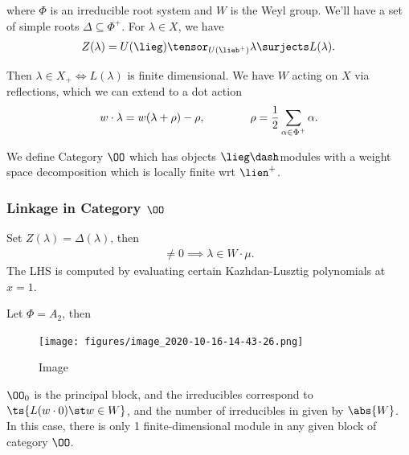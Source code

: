 where \(\Phi\) is an irreducible root system and \(W\) is the Weyl
group. We'll have a set of simple roots \(\Delta\subseteq \Phi^+\). For
\(\lambda\in X\), we have
\begin{align*}  
Z(\lambda) = U(\lieg) \tensor_{U(\lieb^+)} \lambda \surjects L(\lambda)
.\end{align*}

Then \(\lambda \in X_+ \iff L(\lambda)\) is finite dimensional. We have
\(W\) acting on \(X\) via reflections, which we can extend to a dot
action
\begin{align*}  
w\cdot \lambda = w(\lambda + \rho) - \rho, \hspace{4em} \rho = {1\over 2}\sum_{\alpha\in\Phi^+} \alpha
.\end{align*}

We define Category \(\OO\) which has objects \(\lieg\dash\)modules with
a weight space decomposition which is locally finite wrt \(\lien^+\).

\hypertarget{linkage-in-category-oo}{%
\subsubsection{\texorpdfstring{Linkage in Category
\(\OO\)}{Linkage in Category \textbackslash OO}}\label{linkage-in-category-oo}}

Set \(Z(\lambda) = \Delta(\lambda)\), then
\begin{align*}  
[Z(\lambda) : L(\mu)] \neq 0 \implies \lambda \in W\cdot \mu
.\end{align*} The LHS is computed by evaluating certain Kazhdan-Lusztig
polynomials at \(x=1\).

\begin{example}

Let \(\Phi= A_2\), then

\begin{figure}
\centering
\texttt{[image: figures/image\_2020-10-16-14-43-26.png]}
\caption{Image}
\end{figure}

\(\OO_0\) is the principal block, and the irreducibles correspond to
\(\ts{L(w\cdot 0) \st w\in W}\), and the number of irreducibles in given
by \(\abs{W}\). In this case, there is only 1 finite-dimensional module
in any given block of category \(\OO\).

\end{example}

